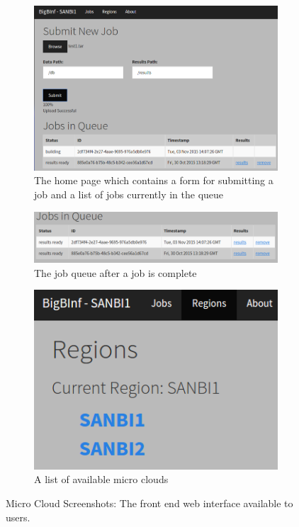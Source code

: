 \documentclass{sig-alternate-05-2015}
\begin{document}
\begin{figure}[t!]
\centering
	\begin{subfigure}[h]{.9\textwidth}
		\includegraphics[width=\textwidth]{img/screenshot2.png}
		\caption{The home page which contains a form for submitting a job and a list of jobs currently in the queue}
		\label{fig:screenshot2}
	\end{subfigure}
	\begin{subfigure}[h]{.9\textwidth}
		\includegraphics[width=\textwidth]{img/screenshotjobqueue2.png}
		\caption{The job queue after a job is complete}
		\label{fig:screenshotjobqueue}
	\end{subfigure}
	\begin{subfigure}[h]{.5\textwidth}
		\includegraphics[width=\textwidth]{img/screenshotRegions.png}
		\caption{A list of available micro clouds}
		\label{fig:screenshotRegions}
	\end{subfigure}
\caption{Micro Cloud Screenshots: The front end web interface available to users. }
\label{fig:screenshots}
\end{figure}
\end{document}

